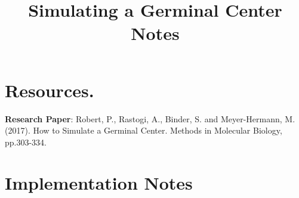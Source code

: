 \documentclass[english]{article}
\begin{document}
\title{Simulating a Germinal Center Notes}
\maketitle

\tableofcontents
\pagebreak	

\section{Resources.}
\textbf{Research Paper}: Robert, P., Rastogi, A., Binder, S. and Meyer-Hermann, M. (2017). How to Simulate a Germinal Center. Methods in Molecular Biology, pp.303-334.


\section{Implementation Notes}
\end{document}
